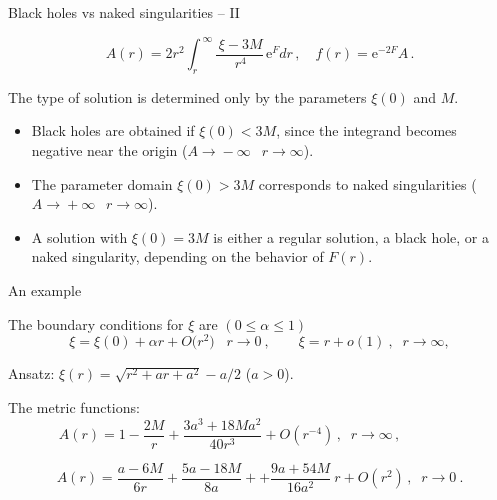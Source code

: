 \documentclass[12pt,aspectratio=139, slidestop,notes=hide]{beamer}
\begin{document}
\begin{frame}
{\centerline {Black holes vs naked singularities -- II\quad}}

\begin{equation}\label{}
A(r)=2r^{2}\!\!\int_{r}^{\,\infty}\! \frac{\,\xi-3M}{\,r^4}\,\mathrm{e}^{F}dr\,, \quad f(r)=\mathrm{e}^{-2F}A\,.\nonumber
\end{equation}

The type of solution is determined only by the parameters $\xi(0)$ and $M$.

\vspace{1ex}
\begin{itemize}
  \item Black holes are obtained if $\xi(0)<3M$, since the integrand becomes negative near the origin ($A\!\rightarrow\!-\infty\!\:\;\; r\!\rightarrow\!\infty$).
      \vspace{1ex}
      \item The parameter domain $\xi(0)>3M$
      corresponds to naked singularities ($A\!\rightarrow\!+\infty\!\:\;\; r\!\rightarrow\!\infty$).
      \vspace{1ex}
      \item A solution with $\xi(0)=3M$ is either
      a regular solution, a black hole, or a naked singularity, depending on the behavior of $F(r)$.
\end{itemize}

\end{frame}


\begin{frame}
{\centerline {An example\quad}}

The boundary conditions for $\xi$ are $(0\leq\alpha\leq1)$
\begin{equation}\label{cond2}
\xi\!=\xi(0)+\alpha{}r+O\big(r^2\big)\;\;\; r\rightarrow0\!\:,
\qquad
\xi\!=r+o(1)\!\:, \;\; r\rightarrow\infty,
\end{equation}

Ansatz: $\xi(r)= \sqrt{r^2+ar+a^2}-a/2$ ($a>0$).

\vspace{2ex}
The metric functions:
\begin{equation}\label{}
A(r)= 1-\frac{2M}{r}+ \frac{3a^3+18Ma^2}{40r^3} + O(r^{-4})\,, \;\; r\rightarrow\infty\,, \qquad\qquad\;
\end{equation}

\begin{equation}\label{}
A(r)= \frac{a-6M}{6r}+ \frac{5a-18M}{8a}+ + \frac{9a+54M}{16a^2}\:\!r+ O(r^2)\,, \;\;r\rightarrow0\!\:.
\end{equation}

\end{frame}
\end{document}
